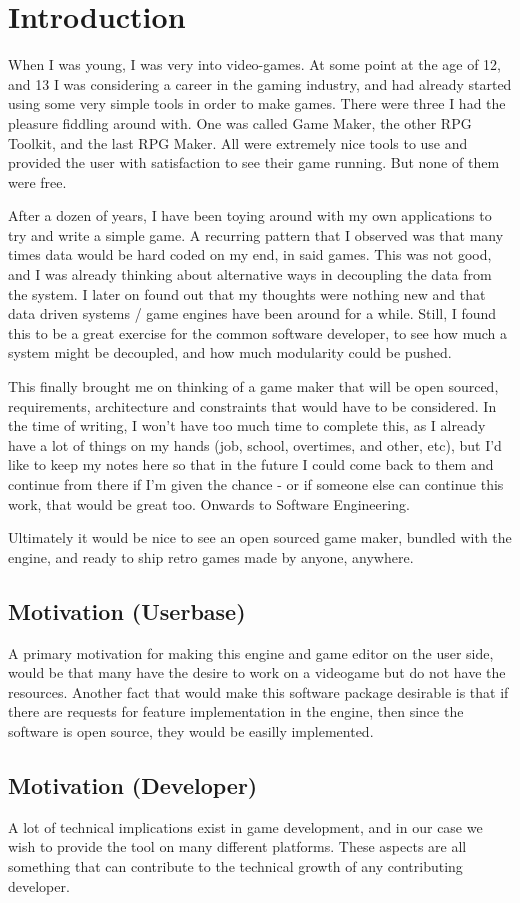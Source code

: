 \section{Introduction}

When I was young, I was very into video-games. At some point at the age of 12,
and 13 I was considering a career in the gaming industry, and had already
started using some very simple tools in order to make games. There were three
I had the pleasure fiddling around with. One was called Game Maker, the other 
RPG Toolkit, and the last RPG Maker. All were extremely nice tools to use and 
provided the user with satisfaction to see their game running. But none of them
were free. 

After a dozen of years, I have been toying around with my own applications to 
try and write a simple game. A recurring pattern that I observed was that many
times data would be hard coded on my end, in said games. This was not good, and
I was already thinking about alternative ways in decoupling the data from the
system. I later on found out that my thoughts were nothing new and that data 
driven systems / game engines have been around for a while. Still, I found this
to be a great exercise for the common software developer, to see how much a 
system might be decoupled, and how much modularity could be pushed. 

This finally brought me on thinking of a game maker that will be open sourced,
requirements, architecture and constraints that would have to be considered. In
the time of writing, I won't have too much time to complete this, as I already
have a lot of things on my hands (job, school, overtimes, and other, etc), but
I'd like to keep my notes here so that in the future I could come back to them
and continue from there if I'm given the chance - or if someone else can
continue this work, that would be great too. Onwards to Software Engineering.

Ultimately it would be nice to see an open sourced game maker, bundled with the
engine, and ready to ship retro games made by anyone, anywhere.

\subsection{Motivation (Userbase)} 

A primary motivation for making this engine and game editor on the user side,
would be that many have the desire to work on a videogame but do not have the
resources. Another fact that would make this software package desirable is that
if there are requests for feature implementation in the engine, then since the 
software is open source, they would be easilly implemented. 

\subsection{Motivation (Developer)}

A lot of technical implications exist in game development, and in our case we
wish to provide the tool on many different platforms. These aspects are all
something that can contribute to the technical growth of any contributing
developer.

